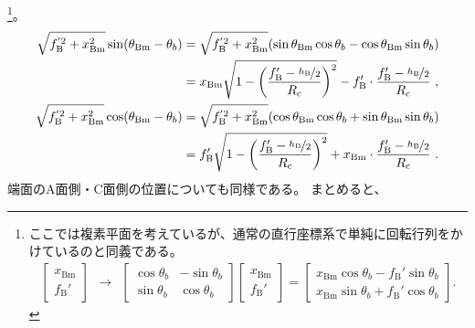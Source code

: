 \footnote{ここでは複素平面を考えているが、通常の直行座標系で単純に回転行列をかけているのと同義である。
\begin{align*}
  \left[
    \begin{array}{c}
      x_\mathrm{Bm}\\
      f_\mathrm B'
    \end{array}
  \right]
  ~~\longrightarrow~~
  \left[
    \begin{array}{cc}
      \cos\theta_b & -\sin\theta_b\\
      \sin\theta_b & \cos\theta_b
    \end{array}
  \right]\!\!
  \left[
    \begin{array}{c}
      x_\mathrm{Bm}\\
      f_\mathrm B'
    \end{array}
  \right]
  = \left[
    \begin{array}{c}
      x_\mathrm{Bm}\cos\theta_b-f_\mathrm B'\sin\theta_b\\
      x_\mathrm{Bm}\sin\theta_b+f_\mathrm B'\cos\theta_b
    \end{array}
  \right].
\end{align*}%
}。
\begin{align*}
  \sqrt{f_\mathrm B^{'2}+x_\mathrm{Bm}^2}\sin(\theta_\mathrm{Bm}-\theta_b)
  &= \sqrt{f_\mathrm B^{'2}+x_\mathrm{Bm}^2}(\sin\theta_\mathrm{Bm}\cos\theta_b-\cos\theta_\mathrm{Bm}\sin\theta_b)\\
  &= x_\mathrm{Bm}\sqrt{1-\left(\frac{f_\mathrm B'-\nicefrac{h_\mathrm B}2}{R_\mathrm c}\right)^2}
     -f_\mathrm B'\cdot\frac{f_\mathrm B'-\nicefrac{h_\mathrm B}2}{R_\mathrm c}~,\\
  \sqrt{f_\mathrm B^{'2}+x_\mathrm{Bm}^2}\cos(\theta_\mathrm{Bm}-\theta_b)
  &= \sqrt{f_\mathrm B^{'2}+x_\mathrm{Bm}^2}(\cos\theta_\mathrm{Bm}\cos\theta_b+\sin\theta_\mathrm{Bm}\sin\theta_b)\\
  &= f_\mathrm B'\sqrt{1-\left(\frac{f_\mathrm B'-\nicefrac{h_\mathrm B}2}{R_\mathrm c}\right)^2}
     +x_\mathrm{Bm}\cdot\frac{f_\mathrm B'-\nicefrac{h_\mathrm B}2}{R_\mathrm c}~.
\end{align*}
端面のA面側・C面側の位置についても同様である。
まとめると、
